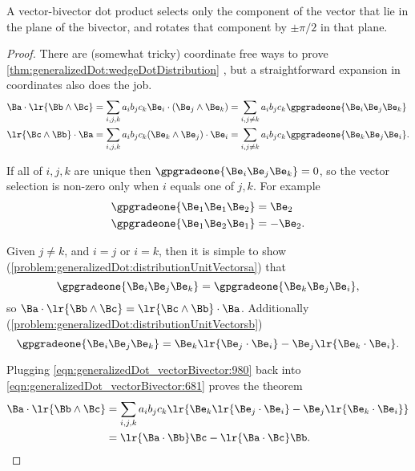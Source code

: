 A vector-bivector dot product selects only the component of the vector that lie in the plane of the bivector, and rotates that component by \( \pm \pi/2 \) in that plane.
\begin{proof}
There are (somewhat tricky) coordinate free ways to prove
\cref{thm:generalizedDot:wedgeDotDistribution}
, but a straightforward expansion in coordinates also does the job.
\begin{equation}\label{eqn:generalizedDot_vectorBivector:681}
\begin{aligned}
\Ba \cdot \lr{ \Bb \wedge \Bc } &= \sum_{i, j, k} a_i b_j c_k \Be_i \cdot (\Be_j \wedge \Be_k)
= \sum_{i, j \ne k} a_i b_j c_k \gpgradeone{ \Be_i \Be_j \Be_k }
\\
\lr{ \Bc \wedge \Bb } \cdot \Ba &= \sum_{i, j, k} a_i b_j c_k (\Be_k \wedge \Be_j) \cdot \Be_i
= \sum_{i, j \ne k} a_i b_j c_k \gpgradeone{ \Be_k \Be_j \Be_i }.
\end{aligned}
\end{equation}

If all of \( i, j, k \) are unique then \( \gpgradeone{ \Be_i \Be_j \Be_k } = 0 \), so the vector selection is non-zero only when \( i \) equals one of \( j, k \).
For example
\begin{equation}\label{eqn:generalizedDot_vectorBivector:1040}
\begin{aligned}
\gpgradeone{ \Be_1 \Be_1 \Be_2 } &= \Be_2 \\
\gpgradeone{ \Be_1 \Be_2 \Be_1 } &= -\Be_2.
\end{aligned}
\end{equation}

Given \( j \ne k \), and \( i = j \) or \( i = k \),  then it is simple to show
(\cref{problem:generalizedDot:distributionUnitVectorsa})
that
\begin{equation}\label{eqn:generalizedDot_vectorBivector:1020}
\gpgradeone{ \Be_i \Be_j \Be_k }
= \gpgradeone{ \Be_k \Be_j \Be_i },
\end{equation}
so \( \Ba \cdot \lr{ \Bb \wedge \Bc } = \lr{ \Bc \wedge \Bb } \cdot \Ba \).
Additionally
(\cref{problem:generalizedDot:distributionUnitVectorsb})
\begin{equation}\label{eqn:generalizedDot_vectorBivector:980}
\gpgradeone{ \Be_i \Be_j \Be_k }
=
\Be_k \lr{ \Be_j \cdot \Be_i }
-\Be_j \lr{ \Be_k \cdot \Be_i }.
\end{equation}

Plugging \cref{eqn:generalizedDot_vectorBivector:980} back into \cref{eqn:generalizedDot_vectorBivector:681} proves the theorem
\begin{equation}\label{eqn:generalizedDot_vectorBivector:1060}
\begin{aligned}
\Ba \cdot \lr{ \Bb \wedge \Bc }
&= \sum_{i, j, k} a_i b_j c_k \lr{ \Be_k \lr{ \Be_j \cdot \Be_i } -\Be_j \lr{ \Be_k \cdot \Be_i } } \\
&= \lr{ \Ba \cdot \Bb } \Bc - \lr{ \Ba \cdot \Bc } \Bb.
\end{aligned}
\end{equation}
\end{proof}

